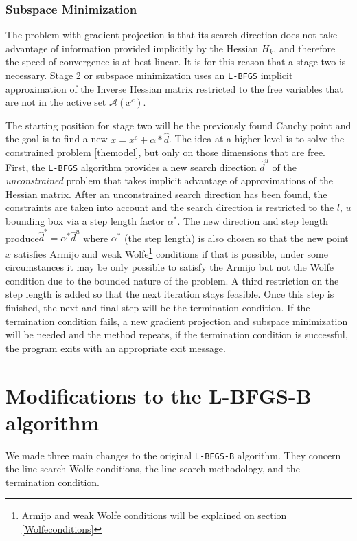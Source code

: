 \subsection{Subspace Minimization}

The problem with gradient projection is that its search direction does not take advantage of information provided implicitly by the Hessian $H_k$, and therefore the speed of convergence is at best linear. It is for this reason that a stage two is necessary. Stage 2 or subspace minimization uses an \texttt{L-BFGS} implicit approximation of the Inverse Hessian matrix restricted to the free variables that are not in the active set $\mathcal{A}(x^c)$.

The starting position for stage two will be the previously found Cauchy point and the goal is to find a new $\bar{x} = x^c + \alpha * \hat{d}$. The idea at a higher level is to solve the constrained problem \eqref{themodel}, but only on those dimensions that are free. First, the \texttt{L-BFGS} algorithm provides a new search direction $\hat{d}^u$ of the \emph{unconstrained} problem that takes implicit advantage of approximations of the Hessian matrix. After an unconstrained search direction has been found, the constraints are taken into account and the search direction is restricted to the $l$, $u$ bounding box via a step length factor $\alpha^*$. The new direction and step length produce$\hat{d}^* = \alpha^* \hat{d}^u$ where $\alpha^*$ (the step length) is also chosen so that the new point $\bar{x}$ satisfies Armijo and weak Wolfe\footnote{Armijo and weak Wolfe conditions will be explained on section \eqref{Wolfeconditions}} conditions if that is possible, under some circumstances it may be only possible to satisfy the Armijo but not the Wolfe condition due to the bounded nature of the problem. A third restriction on the step length is added so that the next iteration stays feasible. Once this step is finished, the next and final step will be the termination condition. If the termination condition fails, a new gradient projection and subspace minimization will be needed and the method repeats, if the termination condition is successful, the program exits with an appropriate exit message.

\chapter{Modifications to the L-BFGS-B algorithm}

We made three main changes to the original \texttt{L-BFGS-B} algorithm. They concern the line search Wolfe conditions, the line search methodology, and the termination condition.

